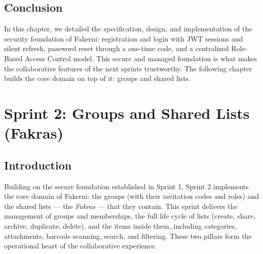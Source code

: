 \documentclass[12pt,a4paper,oneside]{report}
\begin{document}
\section{Conclusion}
In this chapter, we detailed the specification, design, and implementation of the
security foundation of Fakerni: registration and login with JWT sessions and
silent refresh, password reset through a one-time code, and a centralized
Role-Based Access Control model. This secure and managed foundation is what makes
the collaborative features of the next sprints trustworthy. The following chapter
builds the core domain on top of it: groups and shared lists.

\chapter{Sprint 2: Groups and Shared Lists (Fakras)}

\section{Introduction}
Building on the secure foundation established in Sprint 1, Sprint 2 implements the
core domain of Fakerni: the groups (with their invitation codes and roles) and the
shared lists --- the \emph{Fakras} --- that they contain. This sprint delivers the
management of groups and memberships, the full life cycle of lists (create, share,
archive, duplicate, delete), and the items inside them, including categories,
attachments, barcode scanning, search, and filtering. These two pillars form the
operational heart of the collaborative experience.
\end{document}
